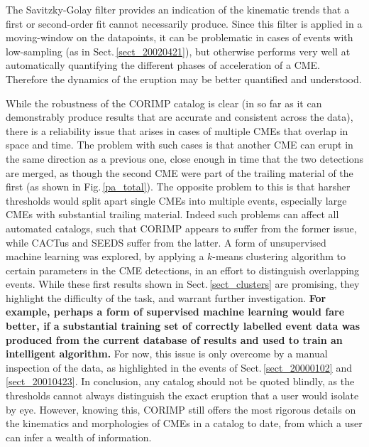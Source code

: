 \documentclass[referee,a4paper,12pt,traditabstract]{swsc}
\begin{document}
\begin{linenumbers}
The Savitzky-Golay filter provides an indication of the kinematic trends that a first or second-order fit cannot necessarily produce. Since this filter is applied in a moving-window on the datapoints, it can be problematic in cases of events with low-sampling (as in Sect.\,\ref{sect_20020421}), but otherwise performs very well at automatically quantifying the different phases of acceleration of a CME. Therefore the dynamics of the eruption may be better quantified and understood.  

While the robustness of the CORIMP catalog is clear (in so far as it can demonstrably produce results that are accurate and consistent across the data), there is a reliability issue that arises in cases of multiple CMEs that overlap in space and time. The problem with such cases is that another CME can erupt in the same direction as a previous one, close enough in time that the two detections are merged, as though the second CME were part of the trailing material of the first (as shown in Fig.\,\ref{pa_total}). The opposite problem to this is that harsher thresholds would split apart single CMEs into multiple events, especially large CMEs with substantial trailing material. Indeed such problems can affect all automated catalogs, such that CORIMP appears to suffer from the former issue, while CACTus and SEEDS suffer from the latter. A form of unsupervised machine learning was explored, by applying a $k$-means clustering algorithm to certain parameters in the CME detections, in an effort to distinguish overlapping events. While these first results shown in Sect.\,\ref{sect_clusters} are promising, they highlight the difficulty of the task, and warrant further investigation. {\bf For example, perhaps a form of supervised machine learning would fare better, if a substantial training set of correctly labelled event data was produced from the current database of results and used to train an intelligent algorithm.} For now, this issue is only overcome by a manual inspection of the data, as highlighted in the events of Sect.\,\ref{sect_20000102} and \ref{sect_20010423}. In conclusion, any catalog should not be quoted blindly, as the thresholds cannot always distinguish the exact eruption that a user would isolate by eye. However, knowing this, CORIMP still offers the most rigorous details on the kinematics and morphologies of CMEs in a catalog to date, from which a user can infer a wealth of information.




\begin{acknowledgements}
     

\end{acknowledgements}
\end{linenumbers}
\end{document}
